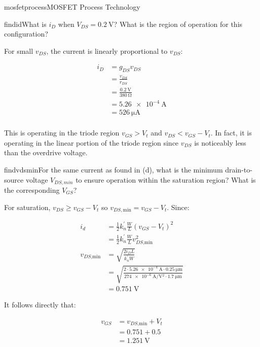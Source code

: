 \begin{mainquestion}{mosfetprocess}{MOSFET Process Technology}
\begin{partquestion}{findid}{What is $i_{D}$ when $V_{DS} = \qty{0.2}{\volt}$? What is the region of operation for this configuration?}
\begin{answer}
For small $v_{DS}$, the current is linearly proportional to $v_{DS}$:

\begin{align*}
    i_D &= g_{DS} v_{DS} \\
    &= \frac{v_{DS}}{r_{DS}} \\
    &= \frac{\qty{0.2}{\volt}}{\qty{380}{\ohm}} \\
    &= \qty{5.26e-4}{\ampere} \\
    &= \qty{526}{\micro\ampere} \\
\end{align*}

This is operating in the triode region $v_{GS} > V_{t}$ and $v_{DS} < v_{GS} - V_{t}$. In fact, it is operating in the linear portion of the triode region since $v_{DS}$ is noticeably less than the overdrive voltage.
\end{answer}
\end{partquestion}

\begin{partquestion}{findvdsmin}{For the same current as found in (d), what is the minimum drain-to-source voltage $V_{DS,min}$ to ensure operation within the saturation region? What is the corresponding $V_{GS}$?}
\begin{answer}
For saturation, $v_{DS} \geq v_{GS} - V_{t}$ so $v_{DS,\text{min}} = v_{GS} - V_{t}$. Since:

\begin{align*}
    i_d &= \frac{1}{2} k^{'}_n \frac{W}{L} (v_{GS}-V_t)^2 \\
    &= \frac{1}{2} k^{'}_n \frac{W}{L} v^2_{DS\text{,min}} \\
    v_{DS\text{,min}} &= \sqrt{\frac{2 i_D L}{k^{'}_n W}} \\
    &= \sqrt{\frac{2 \cdot \qty{5.26e-4}{\ampere} \cdot \qty{0.25}{\micro\meter}}{\qty{274e-6}{\ampere/\volt^2}  \cdot\qty{1.7}{\micro\meter}}} \\
    &= \qty{0.751}{\volt}
\end{align*}

It follows directly that:

\begin{align*}
    v_{GS} &= v_{DS\text{,min}} + V_t \\
    &= 0.751 + 0.5 \\
    &= \qty{1.251}{\volt}
\end{align*}

\end{answer}
\end{partquestion}

\end{mainquestion}
